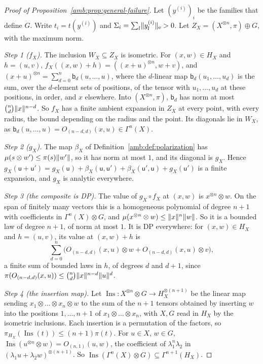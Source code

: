 \begin{proof}[Proof of Proposition~\ref{amb:prop:general-failure}]
Let $(y^{(i)})_i$ be the families that define $G$. Write $t_i=t(y^{(i)})$ and $\Sigma_i=\sum_l\lVert y^{(i)}_l\rVert_{\rm e}>0$. Let $Z_X=(X^{\otimes n},\pi)\oplus G$, with the maximum norm.

\emph{Step 1 ($f_X$).} The inclusion $W_X\subseteq Z_X$ is isometric. For $(x,w)\in H_X$ and $h=(u,v)$, $f_X((x,w)+h)=((x+u)^{\otimes n},w+v)$, and $(x+u)^{\otimes n}=\sum_{d=0}^n\mathsf b_d(u,\dots,u)$, where the $d$-linear map $\mathsf b_d(u_1,\dots,u_d)$ is the sum, over the $d$-element sets of positions, of the tensor with $u_1,\dots,u_d$ at these positions, in order, and $x$ elsewhere. Into $(X^{\otimes n},\pi)$, $\mathsf b_d$ has norm at most $\binom nd\lVert x\rVert^{n-d}$. So $f_X$ has a finite ambient expansion in $Z_X$ at every point, with every radius, the bound depending on the radius and the point. Its diagonals lie in $W_X$, as $\mathsf b_d(u,\dots,u)=O_{(n-d,d)}(x,u)\in\Gamma^n(X)$.

\emph{Step 2 ($g_X$).} The map $\beta_X$ of Definition~\ref{amb:def:polarization} has $\mu(s\otimes w')\le\pi(s)\lVert w'\rVert$, so it has norm at most $1$, and its diagonal is $g_X$. Hence $g_X(\mathsf u+\mathsf u')=g_X(\mathsf u)+\beta_X(\mathsf u,\mathsf u')+\beta_X(\mathsf u',\mathsf u)+g_X(\mathsf u')$ is a finite expansion, and $g_X$ is analytic everywhere.

\emph{Step 3 (the composite is DP).} The value of $g_X\circ f_X$ at $(x,w)$ is $x^{\otimes n}\otimes w$. On the span of finitely many vectors this is a homogeneous polynomial of degree $n+1$ with coefficients in $\Gamma^n(X)\otimes G$, and $\mu(x^{\otimes n}\otimes w)\le\lVert x\rVert^n\lVert w\rVert$. So it is a bounded law of degree $n+1$, of norm at most $1$. It is DP everywhere: for $(x,w)\in H_X$ and $h=(u,v)$, its value at $(x,w)+h$ is
\[
 \sum_{d=0}^n\bigl(O_{(n-d,d)}(x,u)\otimes w+O_{(n-d,d)}(x,u)\otimes v\bigr),
\]
a finite sum of bounded laws in $h$, of degrees $d$ and $d+1$, since $\pi(O_{(n-d,d)}(x,u))\le\binom nd\lVert x\rVert^{n-d}\lVert u\rVert^d$.

\emph{Step 4 (the insertion map).} Let $\operatorname{Ins}\colon X^{\otimes n}\otimes G\to H_X^{\otimes(n+1)}$ be the linear map sending $x_1\otimes\dots\otimes x_n\otimes w$ to the sum of the $n+1$ tensors obtained by inserting $w$ into the positions $1,\dots,n+1$ of $x_1\otimes\dots\otimes x_n$, with $X,G$ read in $H_X$ by the isometric inclusions. Each insertion is a permutation of the factors, so $\pi_{H_X}(\operatorname{Ins}(t))\le(n+1)\pi(t)$. For $u\in X$, $w\in G$, $\operatorname{Ins}(u^{\otimes n}\otimes w)=O_{(n,1)}(u,w)$, the coefficient of $\lambda_1^n\lambda_2$ in $(\lambda_1u+\lambda_2w)^{\otimes(n+1)}$. So $\operatorname{Ins}(\Gamma^n(X)\otimes G)\subseteq\Gamma^{n+1}(H_X)$.


\end{proof}
